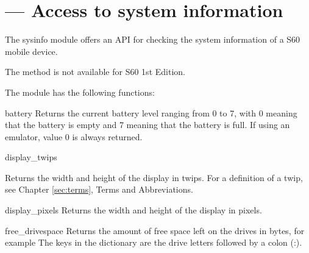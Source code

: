 %
%
%

\section{ ---
    Access to system information}
\label{sec:sysinfo}
The \textsf{sysinfo} module offers an API for checking the system 
information of a S60 mobile device. 

\begin{notice}[note]
The method  is not available for S60 1st Edition.
\end{notice}

The  module has the following functions:

\begin{funcdesc}{battery}{}
Returns the current battery level ranging from 0 to 7, with 0 meaning that 
the battery is empty and 7 meaning that the battery is full. If using an 
emulator, value 0 is always returned.
\end{funcdesc}


\begin{funcdesc}{display_twips}{}

Returns the width and height of the display in twips. For a definition of a 
twip, see Chapter \ref{sec:terms}, Terms and Abbreviations. 

\end{funcdesc}

\begin{funcdesc}{display_pixels}{}
Returns the width and height of the display in pixels.
\end{funcdesc}

\begin{funcdesc}{free_drivespace}{}
Returns the amount of free space left on the drives in bytes, for example 
 The keys in the dictionary are the drive letters 
followed by a colon (:). 
\end{funcdesc}

